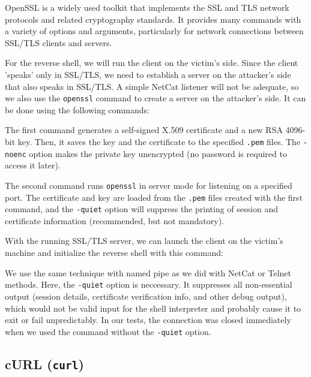 OpenSSL is a widely used toolkit that implements the SSL and TLS network protocols and related cryptography standards. It provides many commands with a variety of options and arguments, particularly for network connections between SSL/TLS clients and servers.

For the reverse shell, we will run the client on the victim's side. Since the client 'speaks' only in SSL/TLS, we need to establish a server on the attacker's side that also speaks in SSL/TLS. A simple NetCat listener will not be adequate, so we also use the \texttt{openssl} command to create a server on the attacker's side. It can be done using the following commands:


The first command generates a self-signed X.509 certificate and a new RSA 4096-bit key. Then, it saves the key and the certificate to the specified \texttt{.pem} files. The \texttt{-noenc} option makes the private key unencrypted (no password is required to access it later).

The second command runs \texttt{openssl} in server mode for listening on a specified port. The certificate and key are loaded from the \texttt{.pem} files created with the first command, and the \texttt{-quiet} option will suppress the printing of session and certificate information (recommended, but not mandatory). \cite{openssl-doc}

With the running SSL/TLS server, we can launch the client on the victim's machine and initialize the reverse shell with this command:



We use the same technique with named pipe as we did with NetCat or Telnet methods. Here, the \texttt{-quiet} option is neccessary. It suppresses all non-essential output (session details, certificate verification info, and other debug output), which would not be valid input for the shell interpreter and probably cause it to exit or fail unpredictably. In our tests, the connection was closed immediately when we used the command without the \texttt{-quiet} option.


\subsection{cURL (\texttt{curl})}

